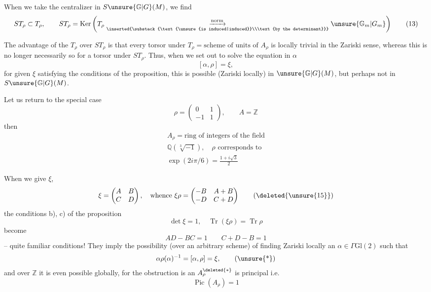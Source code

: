 When we take the centralizer in
$S\unsure{\mathbb G|G}(M)$, we find
\[
ST_\rho\subset T_\rho,\qquad
ST_\rho=\operatorname{Ker}\left(
T_\rho
\underset{\inserted{\substack{\text{\unsure{is induced|induced}}\\\text{by the determinant}}}}
{\xrightarrow{\text{norm}}}\unsure{\mathbb G_m|G_m}\right)
\tag{13}
\]

The advantage of the $T_\rho$ over $ST_\rho$ is that
every torsor under $T_\rho=\text{scheme of units of }A_\rho$
is locally trivial in the Zariski sense, whereas
this is no longer necessarily so for
a torsor under $ST_\rho$. Thus, when
we set out to solve the equation in $\alpha$
\[
[\alpha,\rho]=\xi,
\]
for given $\xi$ satisfying the conditions of the
proposition, this is possible (Zariski locally) in
$\unsure{\mathbb G|G}(M)$, but perhaps not in $S\unsure{\mathbb G|G}(M)$.



Let us return to the special case
\[
\rho=\begin{pmatrix}0&1\\-1&1\end{pmatrix},\qquad A=\mathbb Z
\]
then
\[
\begin{gathered}
A_\rho=\text{ring of integers of the field}\\
\mathbb Q(\sqrt[3]{-1}),\quad \rho\text{ corresponds to}\\
\exp(2i\pi/6)=\frac{1+i\sqrt3}{2}
\end{gathered}
\tag{14}
\]

When we give  $\xi$, 
\[
\xi=\begin{pmatrix}A&B\\C&D\end{pmatrix},\quad
\text{whence }\xi\rho=
\begin{pmatrix}-B&A+B\\-D&C+D\end{pmatrix}
\tag{\deleted{\unsure{15}}}
\]
the conditions  b), c) of the proposition
\[
\det\xi=1,\quad \operatorname{Tr}(\xi\rho)=\operatorname{Tr}\rho
\]
 become
\[
AD-BC=1\qquad C+D-B=1
\tag{16}
\]
-- quite familiar conditions! They imply
the possibility  (over an arbitrary scheme)
of finding Zariski locally an $\alpha\in\Gamma\mathrm{Gl}(2)$
such that 
\[
\alpha\rho(\alpha)^{-1}=[\alpha,\rho]=\xi,
\tag{\unsure{*}}
\]
and over $\mathbb Z$ it is even possible globally,
for the obstruction is an 
$A_\rho^{\deleted{*}}$ is principal  i.e. 
\[
\operatorname{Pic}(A_\rho)=1
\tag{17}
\]

